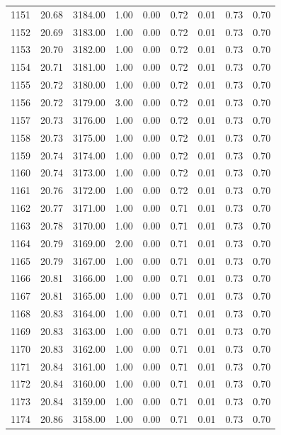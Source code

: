 \documentclass{article}\usepackage[]{graphicx}\usepackage[]{color}
\begin{document}
\begin{longtable}{rrrrrrrrr}
  1151 & 20.68 & 3184.00 & 1.00 & 0.00 & 0.72 & 0.01 & 0.73 & 0.70 \\ 
  1152 & 20.69 & 3183.00 & 1.00 & 0.00 & 0.72 & 0.01 & 0.73 & 0.70 \\ 
  1153 & 20.70 & 3182.00 & 1.00 & 0.00 & 0.72 & 0.01 & 0.73 & 0.70 \\ 
  1154 & 20.71 & 3181.00 & 1.00 & 0.00 & 0.72 & 0.01 & 0.73 & 0.70 \\ 
  1155 & 20.72 & 3180.00 & 1.00 & 0.00 & 0.72 & 0.01 & 0.73 & 0.70 \\ 
  1156 & 20.72 & 3179.00 & 3.00 & 0.00 & 0.72 & 0.01 & 0.73 & 0.70 \\ 
  1157 & 20.73 & 3176.00 & 1.00 & 0.00 & 0.72 & 0.01 & 0.73 & 0.70 \\ 
  1158 & 20.73 & 3175.00 & 1.00 & 0.00 & 0.72 & 0.01 & 0.73 & 0.70 \\ 
  1159 & 20.74 & 3174.00 & 1.00 & 0.00 & 0.72 & 0.01 & 0.73 & 0.70 \\ 
  1160 & 20.74 & 3173.00 & 1.00 & 0.00 & 0.72 & 0.01 & 0.73 & 0.70 \\ 
  1161 & 20.76 & 3172.00 & 1.00 & 0.00 & 0.72 & 0.01 & 0.73 & 0.70 \\ 
  1162 & 20.77 & 3171.00 & 1.00 & 0.00 & 0.71 & 0.01 & 0.73 & 0.70 \\ 
  1163 & 20.78 & 3170.00 & 1.00 & 0.00 & 0.71 & 0.01 & 0.73 & 0.70 \\ 
  1164 & 20.79 & 3169.00 & 2.00 & 0.00 & 0.71 & 0.01 & 0.73 & 0.70 \\ 
  1165 & 20.79 & 3167.00 & 1.00 & 0.00 & 0.71 & 0.01 & 0.73 & 0.70 \\ 
  1166 & 20.81 & 3166.00 & 1.00 & 0.00 & 0.71 & 0.01 & 0.73 & 0.70 \\ 
  1167 & 20.81 & 3165.00 & 1.00 & 0.00 & 0.71 & 0.01 & 0.73 & 0.70 \\ 
  1168 & 20.83 & 3164.00 & 1.00 & 0.00 & 0.71 & 0.01 & 0.73 & 0.70 \\ 
  1169 & 20.83 & 3163.00 & 1.00 & 0.00 & 0.71 & 0.01 & 0.73 & 0.70 \\ 
  1170 & 20.83 & 3162.00 & 1.00 & 0.00 & 0.71 & 0.01 & 0.73 & 0.70 \\ 
  1171 & 20.84 & 3161.00 & 1.00 & 0.00 & 0.71 & 0.01 & 0.73 & 0.70 \\ 
  1172 & 20.84 & 3160.00 & 1.00 & 0.00 & 0.71 & 0.01 & 0.73 & 0.70 \\ 
  1173 & 20.84 & 3159.00 & 1.00 & 0.00 & 0.71 & 0.01 & 0.73 & 0.70 \\ 
  1174 & 20.86 & 3158.00 & 1.00 & 0.00 & 0.71 & 0.01 & 0.73 & 0.70 \\ 

\end{longtable}
\end{document}
